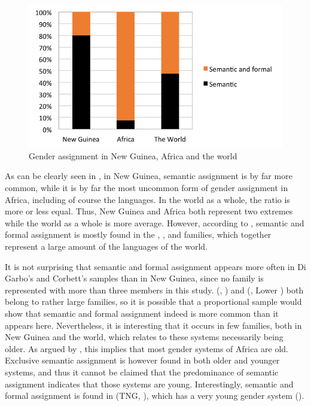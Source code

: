 \documentclass[output=collectionpaper]{langsci/langscibook}
\begin{document}
\begin{figure}
\includegraphics[width=\textwidth]{figures/09/fig9.png}
\caption{Gender assignment in New Guinea, Africa and the world}
\label{fig:Svard:9}
\end{figure}


As can be clearly seen in , in New Guinea, semantic assignment is by far more common, while it is by far the most uncommon form of gender assignment in Africa, including of course the  languages. In the world as a whole, the ratio is more or less equal. Thus, New Guinea and Africa both represent two extremes while the world as a whole is more average. However, according to \citet{Corbett2013b}, semantic and formal assignment is mostly found in the , , and  families, which together represent a large amount of the languages of the world.



It is not surprising that semantic and formal assignment appears more often in Di Garbo's and Corbett's samples than in New Guinea, since no family is represented with more than three members in this study.  (, ) and  (, Lower ) both belong to rather large families, so it is possible that a proportional sample would show that semantic and formal assignment indeed is more common than it appears here. Nevertheless, it is interesting that it occurs in few families, both in New Guinea and the world, which \citet{Corbett2013b} relates to these systems necessarily being older. As argued by \citet{Luraghi2011}, this implies that most gender systems of Africa are old. Exclusive semantic assignment is however found in both older and younger systems, and thus it cannot be claimed that the predominance of semantic assignment indicates that those systems are young. Interestingly, semantic and formal assignment is found in  (TNG, ), which has a very young gender system (\citealt{Waelchli2018}).
\end{document}
